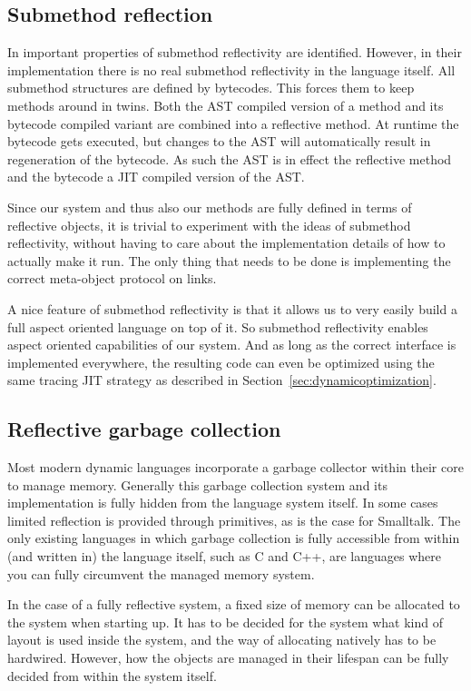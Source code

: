 \documentclass{article}
\newcommand{\secref}[1]{Section~\ref{sec:#1}}
\begin{document}
\subsection{Submethod reflection}
In \cite{submethod reflectivity} important properties of submethod
reflectivity are identified. However, in their implementation there is
no real submethod reflectivity in the language itself. All submethod
structures are defined by bytecodes. This forces them to keep methods
around in twins. Both the AST compiled version of a method and
its bytecode compiled variant are combined into a reflective method.
At runtime the bytecode gets executed, but changes to the AST will
automatically result in regeneration of the bytecode. As such the AST
is in effect the reflective method and the bytecode a JIT compiled
version of the AST. 

Since our system and thus also our methods are fully defined in terms
of reflective objects, it is trivial to experiment with the ideas of
submethod reflectivity, without having to care about the
implementation details of how to actually make it run. The only thing
that needs to be done is implementing the correct meta-object protocol
on links.

A nice feature of submethod reflectivity is that it allows us to very
easily build a full aspect oriented language on top of it. So
submethod reflectivity enables aspect oriented capabilities of our
system. And as long as the correct interface is implemented
everywhere, the resulting code can even be optimized using the same
tracing JIT strategy as described in \secref{dynamicoptimization}.

\subsection{Reflective garbage collection}
Most modern dynamic languages incorporate a garbage collector within
their core to manage memory. Generally this garbage collection system
and its implementation is fully hidden from the language system
itself. In some cases limited reflection is provided through
primitives, as is the case for Smalltalk. The only existing languages
in which garbage collection is fully accessible from within (and
written in) the language itself, such as C and C++, are languages
where you can fully circumvent the managed memory system.

In the case of a fully reflective system, a fixed size of memory can
be allocated to the system when starting up. It has to be decided for
the system what kind of layout is used inside the system, and the way
of allocating natively has to be hardwired. However, how the objects
are managed in their lifespan can be fully decided from within the
system itself.
\end{document}
